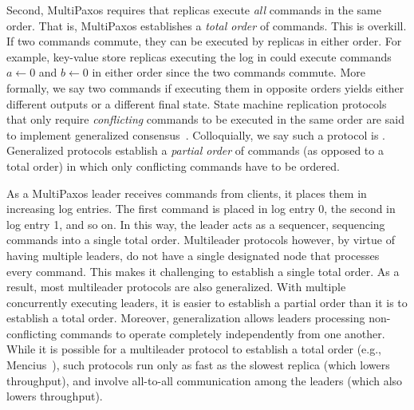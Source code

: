 Second, MultiPaxos requires that replicas execute \emph{all} commands in the
same order. That is, MultiPaxos establishes a \emph{total order} of commands.
This is overkill. If two commands commute, they can be executed by replicas in
either order. For example, key-value store replicas executing the log in
 could execute commands $a \gets 0$ and $b
\gets 0$ in either order since the two commands commute. More formally, we say
two commands  if executing them in opposite orders yields
either different outputs or a different final state. State machine replication
protocols that only require \emph{conflicting} commands to be executed in the
same order are said to implement generalized
consensus~\cite{lamport2005generalized}. Colloquially, we say such a protocol
is . Generalized protocols establish a \emph{partial
order} of commands (as opposed to a total order) in which only conflicting
commands have to be ordered.

As a MultiPaxos leader receives commands from clients, it places them in
increasing log entries. The first command is placed in log entry 0, the second
in log entry 1, and so on. In this way, the leader acts as a sequencer,
sequencing commands into a single total order. Multileader protocols however, by
virtue of having multiple leaders, do not have a single designated node that
processes every command. This makes it challenging to establish a single total
order. As a result, most multileader protocols are also generalized. With
multiple concurrently executing leaders, it is easier to establish a partial
order than it is to establish a total order. Moreover, generalization allows
leaders processing non-conflicting commands to operate completely independently
from one another. While it is possible for a multileader protocol to establish
a total order (e.g., Mencius~\cite{mao2008mencius}), such protocols run only as
fast as the slowest replica (which lowers throughput), and involve all-to-all
communication among the leaders (which also lowers throughput).
